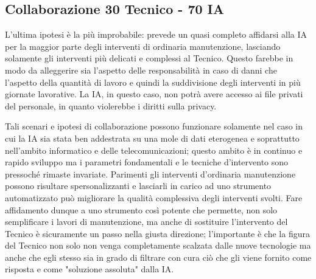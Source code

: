             \subsection*{Collaborazione 30 Tecnico - 70 IA}
                L'ultima ipotesi è la più improbabile: prevede un quasi completo affidarsi alla IA per la maggior parte degli interventi di ordinaria manutenzione, lasciando solamente gli interventi più delicati e complessi al Tecnico. Questo farebbe in modo da alleggerire sia l'aspetto delle responsabilità in caso di danni che l'aspetto della quantità di lavoro e quindi la suddivisione degli interventi in più giornate lavorative. \newline
                La IA, in questo caso, non potrà avere accesso ai file privati del personale, in quanto violerebbe i diritti sulla privacy. 
            \hfill
            \par
                Tali scenari e ipotesi di collaborazione possono funzionare solamente nel caso in cui la IA sia stata ben addestrata su una mole di dati eterogenea e soprattutto nell'ambito informatico e delle telecomunicazioni; questo ambito è in continuo e rapido sviluppo ma i parametri fondamentali e le tecniche d'intervento sono pressoché rimaste invariate. Parimenti gli interventi d'ordinaria manutenzione possono risultare spersonalizzanti e lasciarli in carico ad uno strumento automatizzato può migliorare la qualità complessiva degli interventi svolti. \newline
                Fare affidamento dunque a uno strumento così potente che permette, non solo semplificare i lavori di manutenzione, ma anche di sostituire l'intervento del Tecnico è sicuramente un passo nella giusta direzione; l'importante è che la figura del Tecnico non solo non venga completamente scalzata dalle nuove tecnologie ma anche che egli stesso sia in grado di filtrare con cura ciò che gli viene fornito come risposta e come "soluzione assoluta" dalla IA.